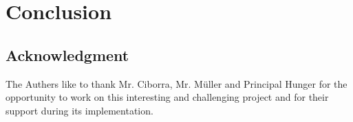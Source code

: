 \section{Conclusion} 
\label{sec:Conclusion}

\subsection{Acknowledgment}
The Authers like to thank Mr. Ciborra, Mr. Müller and Principal Hunger 
for the opportunity to work on this interesting and challenging project 
and for their support during its implementation.











